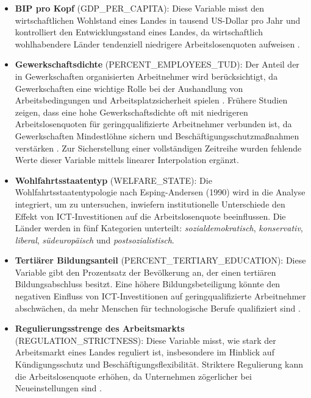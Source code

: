\begin{itemize}
    \item \textbf{\ac{BIP} pro Kopf} (GDP\_PER\_CAPITA): Diese Variable misst den wirtschaftlichen 
    Wohlstand eines Landes in tausend US-Dollar pro Jahr und kontrolliert den Entwicklungsstand 
    eines Landes, da wirtschaftlich wohlhabendere Länder tendenziell niedrigere Arbeitslosenquoten 
    aufweisen \parencite{oecd2022gdp}.
    \item \textbf{Gewerkschaftsdichte} (PERCENT\_EMPLOYEES\_TUD): Der Anteil der in Gewerkschaften 
    organisierten Arbeitnehmer wird berücksichtigt, da Gewerkschaften eine wichtige Rolle bei der 
    Aushandlung von Arbeitsbedingungen und Arbeitsplatzsicherheit spielen \parencite{oecd2022tud}. 
    Frühere Studien zeigen, dass eine hohe Gewerkschaftsdichte oft mit niedrigeren 
    Arbeitslosenquoten für geringqualifizierte Arbeitnehmer verbunden ist, da Gewerkschaften 
    Mindestlöhne sichern und Beschäftigungsschutzmaßnahmen verstärken 
    \parencite[S. 61]{nickell1997unemployment}. Zur Sicherstellung einer vollständigen Zeitreihe 
    wurden fehlende Werte dieser Variable mittels linearer Interpolation ergänzt.
    \item \textbf{Wohlfahrtsstaatentyp} (WELFARE\_STATE): Die Wohlfahrtsstaatentypologie nach 
    Esping-Andersen (1990) \parencite{espingandersen1990thethree} wird in die Analyse integriert, 
    um zu untersuchen, inwiefern institutionelle Unterschiede den Effekt von \ac{ICT}-Investitionen 
    auf die Arbeitslosenquote beeinflussen. Die Länder werden in fünf Kategorien unterteilt: 
    \textit{sozialdemokratisch}, \textit{konservativ}, \textit{liberal}, \textit{südeuropäisch} 
    und \textit{postsozialistisch}.
    \item \textbf{Tertiärer Bildungsanteil} (PERCENT\_TERTIARY\_EDUCATION): Diese 
    Variable gibt den Prozentsatz der Bevölkerung an, der einen tertiären Bildungsabschluss 
    besitzt. Eine höhere Bildungsbeteiligung könnte den negativen Einfluss von 
    \ac{ICT}-Investitionen auf geringqualifizierte Arbeitnehmer abschwächen, da mehr Menschen für 
    technologische Berufe qualifiziert sind \parencite{oecd2022education}.
    \item \textbf{Regulierungsstrenge des Arbeitsmarkts} (REGULATION\_STRICTNESS): Diese Variable 
    misst, wie stark der Arbeitsmarkt eines Landes reguliert ist, insbesondere im Hinblick auf 
    Kündigungsschutz und Beschäftigungsflexibilität. Striktere Regulierung kann die 
    Arbeitslosenquote erhöhen, da Unternehmen zögerlicher bei Neueinstellungen sind 
    \parencite{oecd2022regulation}.
\end{itemize}

